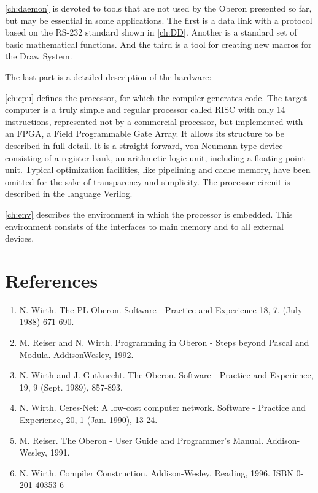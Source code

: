\ref{ch:daemon} is devoted to tools that are not used by the Oberon presented so far, but may
be essential in some applications. The first is a data link with a protocol based on the RS-232
standard shown in \ref{ch:DD}. Another is a standard set of basic mathematical functions. And the
third is a tool for creating new macros for the Draw System.

The last part is a detailed description of the hardware:

\ref{ch:cpu} defines
the processor, for which the compiler generates code. The target computer is a truly simple and
regular processor called RISC with only 14 instructions, represented not by a commercial
processor, but implemented with an FPGA, a Field Programmable Gate Array. It allows its
structure to be described in full detail. It is a straight-forward, von Neumann type device consisting
of a register bank, an arithmetic-logic unit, including a floating-point unit. Typical optimization
facilities, like pipelining and cache memory, have been omitted for the sake of transparency and
simplicity. The processor circuit is described in the language Verilog.

\ref{ch:env} describes the environment in which the processor is embedded. This environment
consists of the interfaces to main memory and to all external devices.

\section*{References}
\begin{enumerate}
  \item N. Wirth. The PL Oberon. Software - Practice and Experience 18, 7, (July 1988) 671-690.
  \item M. Reiser and N. Wirth. Programming in Oberon - Steps beyond Pascal and Modula. AddisonWesley, 1992.
  \item N. Wirth and J. Gutknecht. The Oberon. Software - Practice and Experience, 19, 9 (Sept. 1989), 857-893.
  \item N. Wirth. Ceres-Net: A low-cost computer network. Software - Practice and Experience, 20, 1 (Jan. 1990), 13-24.
  \item M. Reiser. The Oberon - User Guide and Programmer's Manual. Addison-Wesley, 1991.
  \item N. Wirth. Compiler Construction. Addison-Wesley, Reading, 1996. ISBN 0-201-40353-6
\end{enumerate}
